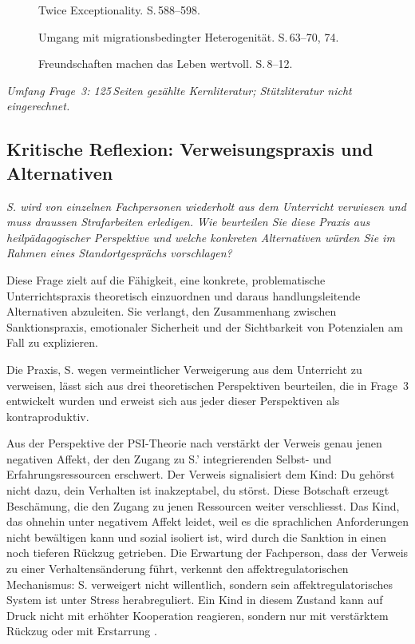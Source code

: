 \documentclass[ngerman, a4paper]{article}
\begin{document}
\begin{description}
  \item[\cite{baumschader2021twice}] Twice Exceptionality. S.\,588--598.
  \item[\cite{kappus2010migration}] Umgang mit migrationsbedingter
        Heterogenität. S.\,63--70, 74.
  \item[\cite{gysinscherzinger2022freundschaftenwertvoll}]
        Freundschaften machen das Leben wertvoll. S.\,8--12.
\end{description}

\textit{Umfang Frage~3: 125\,Seiten gezählte Kernliteratur; Stützliteratur nicht eingerechnet.}





\subsection{Kritische Reflexion: Verweisungspraxis und Alternativen}


\begin{tcolorbox}[colback=gray!5, colframe=gray!50, title=Weiterführende Diskurslinie]
  \itshape
  S. wird von einzelnen Fachpersonen wiederholt aus dem Unterricht verwiesen und
  muss draussen Strafarbeiten erledigen. Wie beurteilen Sie diese Praxis aus
  heilpädagogischer Perspektive und welche konkreten Alternativen würden Sie
  im Rahmen eines Standortgesprächs vorschlagen?
\end{tcolorbox}

Diese Frage zielt auf die Fähigkeit, eine konkrete, problematische Unterrichtspraxis
theoretisch einzuordnen und daraus handlungsleitende Alternativen abzuleiten. Sie
verlangt, den Zusammenhang zwischen Sanktionspraxis, emotionaler Sicherheit und
der Sichtbarkeit von Potenzialen am Fall zu explizieren.

Die Praxis, S. wegen vermeintlicher Verweigerung aus dem Unterricht zu verweisen,
lässt sich aus drei theoretischen Perspektiven beurteilen, die in Frage~3 entwickelt
wurden und erweist sich aus jeder dieser Perspektiven als kontraproduktiv.

Aus der Perspektive der PSI-Theorie nach
\textcite[S.\,47,\,53]{kuhl2019diversitaet} verstärkt der Verweis
genau jenen negativen Affekt, der den Zugang zu S.' integrierenden Selbst-
und Erfahrungsressourcen erschwert.
Der Verweis signalisiert dem Kind: Du gehörst nicht dazu, dein Verhalten ist
inakzeptabel, du störst. Diese Botschaft erzeugt Beschämung, die den
Zugang zu jenen Ressourcen weiter verschliesst. Das Kind, das ohnehin unter negativem Affekt
leidet, weil es die sprachlichen Anforderungen nicht bewältigen kann und sozial
isoliert ist, wird durch die Sanktion in einen noch tieferen Rückzug getrieben.
Die Erwartung der Fachperson, dass der Verweis zu einer Verhaltensänderung führt,
verkennt den affektregulatorischen Mechanismus: S. verweigert nicht willentlich,
sondern sein affektregulatorisches System ist unter Stress herabreguliert. Ein Kind in diesem Zustand
kann auf Druck nicht mit erhöhter Kooperation reagieren, sondern nur mit
verstärktem Rückzug oder mit Erstarrung \parencite[S.\,53]{kuhl2019diversitaet}.
\end{document}
